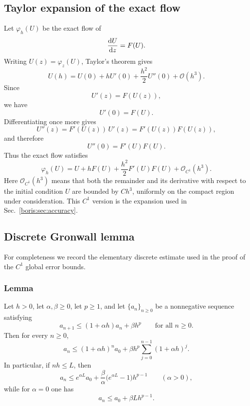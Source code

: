 \subsection{Taylor expansion of the exact flow}
\label{boris:sec:exactflowtaylor}

Let \(\varphi_h(U)\) be the exact flow of
\[
\frac{\text{d} {U}}{\text{d} {z}}=F(U).
\]
Writing \(U(z)=\varphi_z(U)\), Taylor's theorem gives
\[
U(h)=U(0)+hU'(0)+\frac{h^2}{2}U''(0)+\mathcal O(h^3).
\]
Since
\[
U'(z)=F(U(z)),
\]
we have
\[
U'(0)=F(U).
\]
Differentiating once more gives
\[
U''(z)=F'(U(z))\,U'(z)=F'(U(z))F(U(z)),
\]
and therefore
\[
U''(0)=F'(U)F(U).
\]
Thus the exact flow satisfies
\begin{equation}
\varphi_h(U)
=
U+hF(U)+\frac{h^2}{2}F'(U)F(U)+\mathcal O_{C^1}(h^3).
\label{boris:eq:exact_flow_taylor_C1}
\end{equation}
Here \(\mathcal O_{C^1}(h^3)\) means that both the remainder and its derivative
with respect to the initial condition \(U\) are bounded by \(Ch^3\), uniformly
on the compact region under consideration.
This \(C^1\) version is the expansion used in Sec.~\ref{boris:sec:accuracy}.

\subsection{Discrete Gronwall lemma}
\label{boris:sec:gronwall}

For completeness we record the elementary discrete estimate used in the proof
of the \(C^1\) global error bounds.

\subsubsection{Lemma}
Let \(h>0\), let \(\alpha,\beta\ge 0\), let \(p\ge 1\), and let
\(\{a_n\}_{n\ge 0}\) be a nonnegative sequence satisfying
\begin{equation}
a_{n+1}\le (1+\alpha h)a_n + \beta h^p
\qquad \text{for all } n\ge 0.
\label{boris:eq:discrete_gronwall_rec}
\end{equation}
Then for every \(n\ge 0\),
\begin{equation}
a_n \le (1+\alpha h)^n a_0
     + \beta h^p \sum_{j=0}^{n-1}(1+\alpha h)^j.
\label{boris:eq:discrete_gronwall_sum}
\end{equation}
In particular, if \(nh\le L\), then
\begin{equation}
a_n \le e^{\alpha L} a_0
     + \frac{\beta}{\alpha}\bigl(e^{\alpha L}-1\bigr) h^{p-1}
\qquad (\alpha>0),
\label{boris:eq:discrete_gronwall_bound}
\end{equation}
while for \(\alpha=0\) one has
\begin{equation}
a_n \le a_0 + \beta L h^{p-1}.
\label{boris:eq:discrete_gronwall_bound_zero}
\end{equation}

